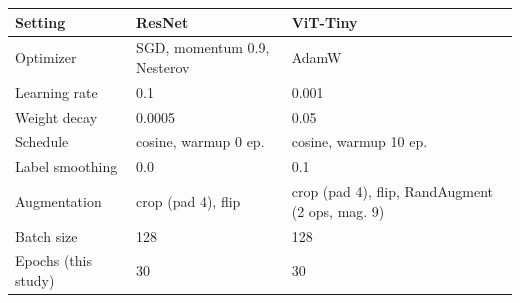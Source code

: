 \begin{tabular}{lll}
\toprule
Setting & ResNet & ViT-Tiny \\
\midrule
Optimizer & SGD, momentum 0.9, Nesterov & AdamW \\
Learning rate & 0.1 & 0.001 \\
Weight decay & 0.0005 & 0.05 \\
Schedule & cosine, warmup 0 ep. & cosine, warmup 10 ep. \\
Label smoothing & 0.0 & 0.1 \\
Augmentation & crop (pad 4), flip & crop (pad 4), flip, RandAugment (2 ops, mag. 9) \\
Batch size & 128 & 128 \\
Epochs (this study) & 30 & 30 \\
\bottomrule
\end{tabular}
